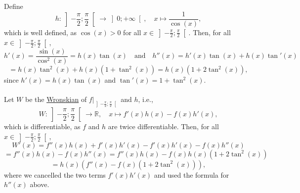 \begin{solution}
    Define
    \[
        h \colon \left]-\frac{\pi}{2};\frac{\pi}{2}\right[ \longrightarrow \left]0;+\infty\right[, \quad x \longmapsto \frac{1}{\cos\left(x\right)},
    \]
    which is well defined, as \( \cos\left(x\right) > 0 \) for all \( x \in \left]-\frac{\pi}{2};\frac{\pi}{2}\right[ \). Then, for all \( x \in \left]-\frac{\pi}{2};\frac{\pi}{2}\right[ \),
    \[
        h'\left(x\right) = \frac{\sin\left(x\right)}{\cos^2\left(x\right)} = h\left(x\right)\tan\left(x\right) \quad \text{and} \quad h''\left(x\right) = h'\left(x\right)\tan\left(x\right)+h\left(x\right)\tan'\left(x\right)
    \]
    \[
        = h\left(x\right)\tan^2\left(x\right)+h\left(x\right)\left(1+\tan^2\left(x\right)\right) = h\left(x\right)\left(1+2\tan^2\left(x\right)\right),
    \]
    since \( h'\left(x\right) = h\left(x\right)\tan\left(x\right) \) and \( \tan'\left(x\right) = 1+\tan^2\left(x\right) \).
    \\\\
    Let \( W \) be the \href{https://en.wikipedia.org/wiki/Wronskian}{Wronskian} of \( f|_{\left]-\frac{\pi}{2};\frac{\pi}{2}\right[} \) and \( h \), i.e.,
    \[
        W \colon \left]-\frac{\pi}{2};\frac{\pi}{2}\right[ \longrightarrow \mathbb{R}, \quad x \longmapsto f'\left(x\right)h\left(x\right)-f\left(x\right)h'\left(x\right),
    \]
    which is differentiable, as \( f \) and \( h \) are twice differentiable. Then, for all \( x \in \left]-\frac{\pi}{2};\frac{\pi}{2}\right[ \),
    \[
        W'\left(x\right) = f''\left(x\right)h\left(x\right) + f'\left(x\right)h'\left(x\right) - f'\left(x\right)h'\left(x\right) - f\left(x\right)h''\left(x\right)
    \]
    \[
        = f''\left(x\right)h\left(x\right) - f\left(x\right)h''\left(x\right) = f''\left(x\right)h\left(x\right) - f\left(x\right)h\left(x\right)\left(1+2\tan^2\left(x\right)\right)
    \]
    \[
        = h\left(x\right)\left(f''\left(x\right) - f\left(x\right)\left(1+2\tan^2\left(x\right)\right)\right),
    \]
    where we cancelled the two terms \( f'\left(x\right)h'\left(x\right) \) and used the formula for \( h''\left(x\right) \) above.
    \\\\

\end{solution}
